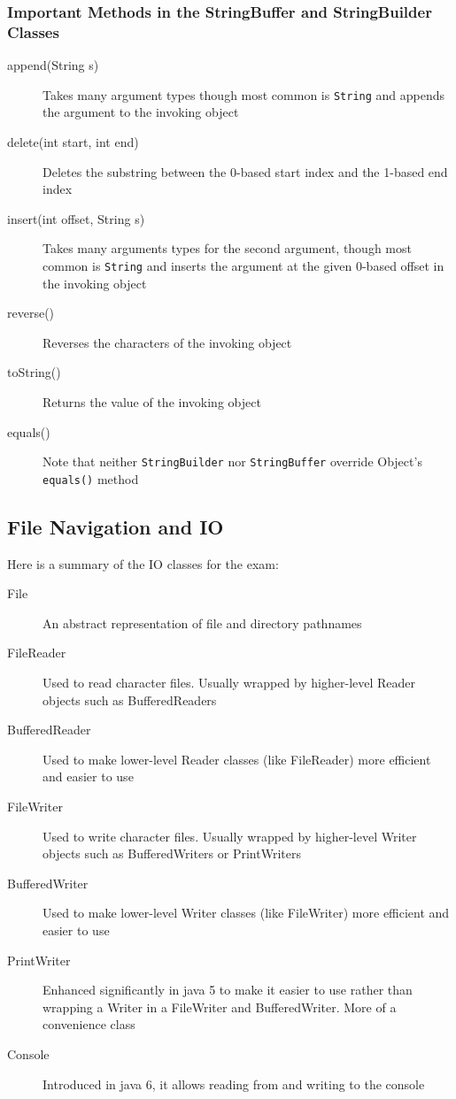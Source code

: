 \subsubsection{Important Methods in the StringBuffer and StringBuilder Classes}
\begin{description}
    \item[append(String s)] Takes many argument types though most common is 
    \verb#String# and appends the argument to the invoking object
    \item[delete(int start, int end)] Deletes the substring between the 0-based 
    start index and the 1-based end index
    \item[insert(int offset, String s)] Takes many arguments types for the 
    second argument, though most common is \verb#String# and inserts the 
    argument at the given 0-based offset in the invoking object
    \item[reverse()] Reverses the characters of the invoking object
    \item[toString()] Returns the value of the invoking object
    \item[equals()] Note that neither \verb#StringBuilder# nor
    \verb#StringBuffer# override Object's \verb#equals()# method
\end{description}

\subsection{File Navigation and IO}
Here is a summary of the IO classes for the exam:
\begin{description}
    \item[File] An abstract representation of file and directory pathnames
    \item[FileReader] Used to read character files. Usually wrapped by 
    higher-level Reader objects such as BufferedReaders
    \item[BufferedReader] Used to make lower-level Reader classes (like 
    FileReader) more efficient and easier to use
    \item[FileWriter] Used to write character files. Usually wrapped by 
    higher-level Writer objects such as BufferedWriters or PrintWriters
    \item[BufferedWriter] Used to make lower-level Writer classes (like 
    FileWriter) more efficient and easier to use
    \item[PrintWriter] Enhanced significantly in java 5 to make it easier to use
    rather than wrapping a Writer in a FileWriter and BufferedWriter. More of a 
    convenience class
    \item[Console] Introduced in java 6, it allows reading from and writing to 
    the console
\end{description}

